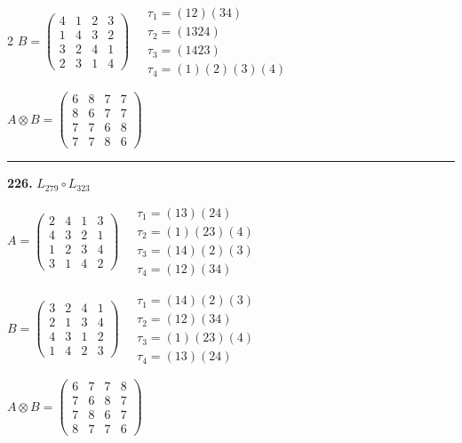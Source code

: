 \begin{multicols}{2}
$B = \begin{pmatrix} 4 & 1 & 2 & 3 \\ 1 & 4 & 3 & 2 \\ 3 & 2 & 4 & 1 \\ 2 & 3 & 1 & 4 \end{pmatrix} \quad \begin{matrix} \tau_{1}=(1 2)(3 4) \\ \tau_{2}=(1 3 2 4) \\ \tau_{3}=(1 4 2 3) \\ \tau_{4}=(1)(2)(3)(4) \end{matrix}$

$A \otimes B = \begin{pmatrix} 6 & 8 & 7 & 7 \\ 8 & 6 & 7 & 7 \\ 7 & 7 & 6 & 8 \\ 7 & 7 & 8 & 6 \end{pmatrix}$

\vspace{0.3em}
\hrule
\vspace{0.3em}

\noindent\textbf{226.} $L_{279} \circ L_{323}$

$A = \begin{pmatrix} 2 & 4 & 1 & 3 \\ 4 & 3 & 2 & 1 \\ 1 & 2 & 3 & 4 \\ 3 & 1 & 4 & 2 \end{pmatrix} \quad \begin{matrix} \tau_{1}=(1 3)(2 4) \\ \tau_{2}=(1)(2 3)(4) \\ \tau_{3}=(1 4)(2)(3) \\ \tau_{4}=(1 2)(3 4) \end{matrix}$

$B = \begin{pmatrix} 3 & 2 & 4 & 1 \\ 2 & 1 & 3 & 4 \\ 4 & 3 & 1 & 2 \\ 1 & 4 & 2 & 3 \end{pmatrix} \quad \begin{matrix} \tau_{1}=(1 4)(2)(3) \\ \tau_{2}=(1 2)(3 4) \\ \tau_{3}=(1)(2 3)(4) \\ \tau_{4}=(1 3)(2 4) \end{matrix}$

$A \otimes B = \begin{pmatrix} 6 & 7 & 7 & 8 \\ 7 & 6 & 8 & 7 \\ 7 & 8 & 6 & 7 \\ 8 & 7 & 7 & 6 \end{pmatrix}$


\end{multicols}
